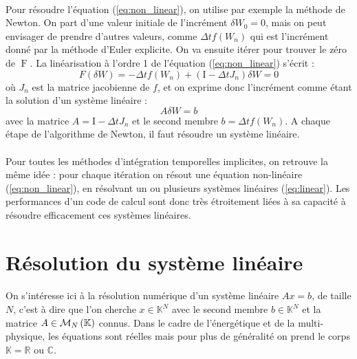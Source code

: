		\paragraph{}
		Pour résoudre l'équation (\ref{eq:non_linear}), on utilise par exemple la méthode de Newton.
		On part d'une valeur initiale de l'incrément $\delta W_0 = 0$, mais on peut envisager de prendre d'autres valeurs, comme $\Delta t f\left(W_n\right)$ qui est l'incrément donné par la méthode d'Euler explicite.
		On va ensuite itérer pour trouver le zéro de $\operatorname{F}$.
		La linéarisation à l'ordre 1 de l'équation (\ref{eq:non_linear}) s'écrit :
		\[F(\delta W) = -\Delta t f\left(W_n\right) + \left(\mathrm{I} - \Delta t J_n\right)\delta W = 0\]
		où $J_n$ est la matrice jacobienne de $f$, et on exprime donc l'incrément comme étant la solution d'un système linéaire :
		\begin{equation}\label{eq:linear}
			A\delta W = b
		\end{equation}
		avec la matrice $A = \mathrm{I} - \Delta t J_n$ et le second membre $b = \Delta t f\left(W_n\right)$.
		A chaque étape de l'algorithme de Newton, il faut résoudre un système linéaire.

		\paragraph{}
		Pour toutes les méthodes d'intégration temporelles implicites, on retrouve la même idée : pour chaque itération on résout une équation non-linéaire (\ref{eq:non_linear}), en résolvant un ou plusieurs systèmes linéaires (\ref{eq:linear}).
		Les performances d'un code de calcul sont donc très étroitement liées à sa capacité à résoudre efficacement ces systèmes linéaires.


\section{Résolution du système linéaire}

	\paragraph{}
	On s'intéresse ici à la résolution numérique d'un système linéaire $Ax = b$, de taille $N$, c'est à dire que l'on cherche $x\in\mathbb{K}^N$ avec le second membre $b\in\mathbb{K}^N$ et la matrice $A\in\mathcal{M}_{N}\left(\mathbb{K}\right)$ connus.
	Dans le cadre de l'énergétique et de la multi-physique, les équations sont réelles mais pour plus de généralité on prend le corps $\mathbb{K} = \mathbb{R}\textrm{ ou }\mathbb{C}$.


